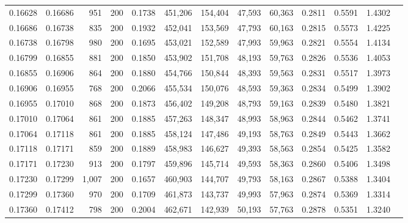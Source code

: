 \begin{tabular}{rrrrrrrrrrrrr}
0.16628 & 0.16686 &   951 & 200 &                                     0.1738 & 451,206 & 154,404 &  47,593 &  60,363 & 0.2811 & 0.5591 & 1.4302 \\
0.16686 & 0.16738 &   835 & 200 &                                     0.1932 & 452,041 & 153,569 &  47,793 &  60,163 & 0.2815 & 0.5573 & 1.4225 \\
0.16738 & 0.16798 &   980 & 200 &                                     0.1695 & 453,021 & 152,589 &  47,993 &  59,963 & 0.2821 & 0.5554 & 1.4134 \\
0.16799 & 0.16855 &   881 & 200 &                                     0.1850 & 453,902 & 151,708 &  48,193 &  59,763 & 0.2826 & 0.5536 & 1.4053 \\
0.16855 & 0.16906 &   864 & 200 &                                     0.1880 & 454,766 & 150,844 &  48,393 &  59,563 & 0.2831 & 0.5517 & 1.3973 \\
0.16906 & 0.16955 &   768 & 200 &                                     0.2066 & 455,534 & 150,076 &  48,593 &  59,363 & 0.2834 & 0.5499 & 1.3902 \\
0.16955 & 0.17010 &   868 & 200 &                                     0.1873 & 456,402 & 149,208 &  48,793 &  59,163 & 0.2839 & 0.5480 & 1.3821 \\
0.17010 & 0.17064 &   861 & 200 &                                     0.1885 & 457,263 & 148,347 &  48,993 &  58,963 & 0.2844 & 0.5462 & 1.3741 \\
0.17064 & 0.17118 &   861 & 200 &                                     0.1885 & 458,124 & 147,486 &  49,193 &  58,763 & 0.2849 & 0.5443 & 1.3662 \\
0.17118 & 0.17171 &   859 & 200 &                                     0.1889 & 458,983 & 146,627 &  49,393 &  58,563 & 0.2854 & 0.5425 & 1.3582 \\
0.17171 & 0.17230 &   913 & 200 &                                     0.1797 & 459,896 & 145,714 &  49,593 &  58,363 & 0.2860 & 0.5406 & 1.3498 \\
0.17230 & 0.17299 & 1,007 & 200 &                                     0.1657 & 460,903 & 144,707 &  49,793 &  58,163 & 0.2867 & 0.5388 & 1.3404 \\
0.17299 & 0.17360 &   970 & 200 &                                     0.1709 & 461,873 & 143,737 &  49,993 &  57,963 & 0.2874 & 0.5369 & 1.3314 \\
0.17360 & 0.17412 &   798 & 200 &                                     0.2004 & 462,671 & 142,939 &  50,193 &  57,763 & 0.2878 & 0.5351 & 1.3240 \\

\end{tabular}
